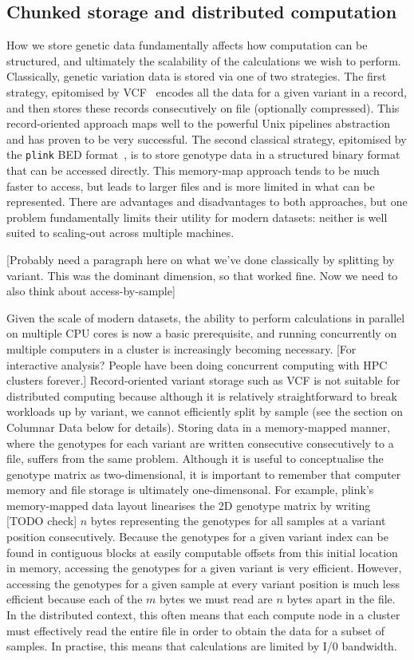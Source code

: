 \documentclass[9pt,lineno]{elife}
\begin{document}
\subsection{Chunked storage and distributed computation}
How we store genetic data fundamentally affects how computation
can be structured, and ultimately the scalability of the calculations
we wish to perform. Classically, genetic variation data is stored via one
of two strategies. The first strategy, epitomised by
VCF~\citep{danecek2011variant} encodes all the data for a given
variant in a record, and then stores these records consecutively on file
(optionally compressed). This record-oriented approach maps well to the
powerful Unix pipelines abstraction and
has proven to be very successful.
The second classical strategy, epitomised
by the \texttt{plink} BED format~\citep{purcell2007plink}, is to
store genotype data in a structured binary format that can be
accessed directly. This memory-map approach tends to
be much faster to access, but leads to larger files and is more
limited in what can be represented. There are advantages and
disadvantages to both approaches, but one problem fundamentally
limits their utility for modern datasets: neither is well suited to
scaling-out across multiple machines.

[Probably need a paragraph here on what we've done classically
by splitting by variant. This was the dominant dimension, so that
worked fine. Now we need to also think about access-by-sample]

Given the scale of modern datasets, the ability to perform
calculations in parallel on multiple CPU cores
is now a basic prerequisite, and
running concurrently on multiple computers in a cluster
is increasingly becoming necessary. [For interactive analysis? People have
been doing concurrent computing with HPC clusters forever.]
Record-oriented variant storage such as VCF is not suitable
for  distributed computing because although it is relatively
straightforward to break workloads up by variant, we cannot efficiently
split by sample (see the section on Columnar Data below for details).
Storing data in a memory-mapped manner, where the genotypes
for each variant are written consecutive consecutively to a file,
suffers from the same problem. Although it is useful to conceptualise
the genotype matrix as two-dimensional, it is important to remember
that computer memory and file storage is ultimately one-dimensonal.
For example, plink's memory-mapped data layout linearises the 2D
genotype matrix by writing [TODO check] $n$ bytes representing
the genotypes for all samples at a variant position consecutively.
Because the genotypes for a given variant index can be found
in contiguous blocks at easily computable offsets from
this initial location in memory,
accessing the genotypes for a given variant is very efficient.
However, accessing the genotypes for a given sample at every
variant position is much less efficient because each of the $m$ bytes we
must read are $n$ bytes apart in the file.
In the distributed context, this often means
that each compute node  in a
cluster must effectively read the entire file in order to obtain the
data for a subset of samples. In practise, this means that calculations
are limited by I/0 bandwidth.
\end{document}

